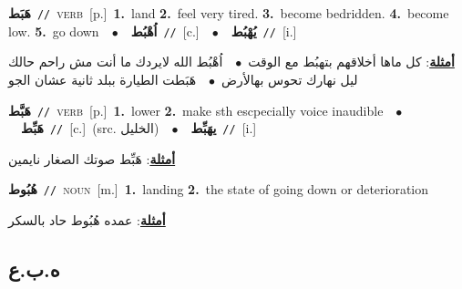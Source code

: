 \documentclass[10pt,a4paper,twoside]{article} %
\begin{document}
\begin{multicols}{2}
{\setlength\topsep{0pt}\textbf{\foreignlanguage{arabic}{هَبَط}}\ {\color{gray}\texttt{//}\color{black}}\ \textsc{verb}\ [p.]\ \textbf{1.}~land  \textbf{2.}~feel very tired.  \textbf{3.}~become bedridden.  \textbf{4.}~become low.  \textbf{5.}~go down\ \ $\bullet$\ \ \setlength\topsep{0pt}\textbf{\foreignlanguage{arabic}{اُهْبُط}}\ {\color{gray}\texttt{//}\color{black}}\ [c.]\ \ $\bullet$\ \ \setlength\topsep{0pt}\textbf{\foreignlanguage{arabic}{يُهْبُط}}\ {\color{gray}\texttt{//}\color{black}}\ [i.]\  \begin{flushright}\color{gray}\foreignlanguage{arabic}{\textbf{\underline{\foreignlanguage{arabic}{أمثلة}}}: كل ماها أخلاقهم بتهبُط مع الوقت\ $\bullet$\ \  اُهْبُط الله لايردك ما أنت مش راحم حالك ليل نهارك تحوس بهالأرض\ $\bullet$\ \  هَبَطت الطيارة ببلد ثانية عشان الجو}\end{flushright}\color{black}} \vspace{2mm}

{\setlength\topsep{0pt}\textbf{\foreignlanguage{arabic}{هَبَّط}}\ {\color{gray}\texttt{//}\color{black}}\ \textsc{verb}\ [p.]\ \textbf{1.}~lower  \textbf{2.}~make sth escpecially voice inaudible\ \ $\bullet$\ \ \setlength\topsep{0pt}\textbf{\foreignlanguage{arabic}{هَبِّط}}\ {\color{gray}\texttt{//}\color{black}}\ [c.]\ (src. \color{gray}\foreignlanguage{arabic}{الخليل}\color{black})\ \ $\bullet$\ \ \setlength\topsep{0pt}\textbf{\foreignlanguage{arabic}{يهَبِّط}}\ {\color{gray}\texttt{//}\color{black}}\ [i.]\  \begin{flushright}\color{gray}\foreignlanguage{arabic}{\textbf{\underline{\foreignlanguage{arabic}{أمثلة}}}: هَبِّط صوتك الصغار نايمين}\end{flushright}\color{black}} \vspace{2mm}

{\setlength\topsep{0pt}\textbf{\foreignlanguage{arabic}{هُبُوط}}\ {\color{gray}\texttt{//}\color{black}}\ \textsc{noun}\ [m.]\ \textbf{1.}~landing  \textbf{2.}~the state of going down or deterioration\  \begin{flushright}\color{gray}\foreignlanguage{arabic}{\textbf{\underline{\foreignlanguage{arabic}{أمثلة}}}: عمده هُبُوط حاد بالسكر}\end{flushright}\color{black}} \vspace{2mm}

\vspace{-3mm}
\subsection*{\color{blue}\foreignlanguage{arabic}{ه.ب.ع}\color{blue}{}} 


\end{multicols}
\end{document}
